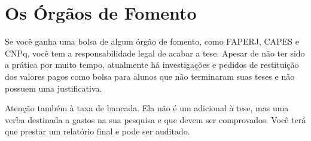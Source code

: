 \section{Os Órgãos de Fomento}

Se você ganha uma bolsa de algum órgão de fomento, como FAPERJ, CAPES e CNPq, você tem a responsabilidade legal de acabar a tese. 
Apesar de não ter sido a prática por muito tempo, atualmente há investigações e pedidos de restituição dos valores pagos como bolsa para alunos que não terminaram suas teses e não possuem uma justificativa.

Atenção também à taxa de bancada. Ela não é um adicional à tese, mas uma verba destinada a gastos na sua pesquisa e que devem ser comprovados. Você terá que prestar um relatório final e pode ser auditado.




